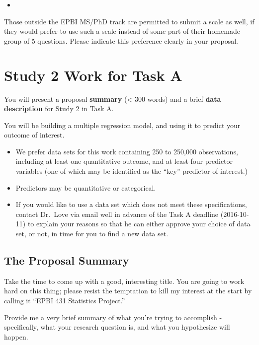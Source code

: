 \documentclass[]{book}
\providecommand{\tightlist}{%
  \setlength{\itemsep}{0pt}\setlength{\parskip}{0pt}}
\theoremstyle{definition}
\theoremstyle{definition}
\theoremstyle{definition}
\theoremstyle{remark}
\begin{document}
\begin{itemize}
\item
\end{itemize}

Those outside the EPBI MS/PhD track are permitted to submit a scale as
well, if they would prefer to use such a scale instead of some part of
their homemade group of 5 questions. Please indicate this preference
clearly in your proposal.

\hypertarget{study-2-work-for-task-a}{%
\section{Study 2 Work for Task A}\label{study-2-work-for-task-a}}

You will present a proposal \textbf{summary} (\textless{} 300 words) and
a brief \textbf{data description} for Study 2 in Task A.

You will be building a multiple regression model, and using it to
predict your outcome of interest.

\begin{itemize}
\tightlist
\item
  We prefer data sets for this work containing 250 to 250,000
  observations, including at least one quantitative outcome, and at
  least four predictor variables (one of which may be identified as the
  ``key'' predictor of interest.)
\item
  Predictors may be quantitative or categorical.
\item
  If you would like to use a data set which does not meet these
  specifications, contact Dr.~Love via email well in advance of the Task
  A deadline (2016-10-11) to explain your reasons so that he can either
  approve your choice of data set, or not, in time for you to find a new
  data set.
\end{itemize}

\hypertarget{the-proposal-summary}{%
\subsection{The Proposal Summary}\label{the-proposal-summary}}

Take the time to come up with a good, interesting title. You are going
to work hard on this thing; please resist the temptation to kill my
interest at the start by calling it ``EPBI 431 Statistics Project.''

Provide me a very brief summary of what you're trying to accomplish -
specifically, what your research question is, and what you hypothesize
will happen.
\end{document}
